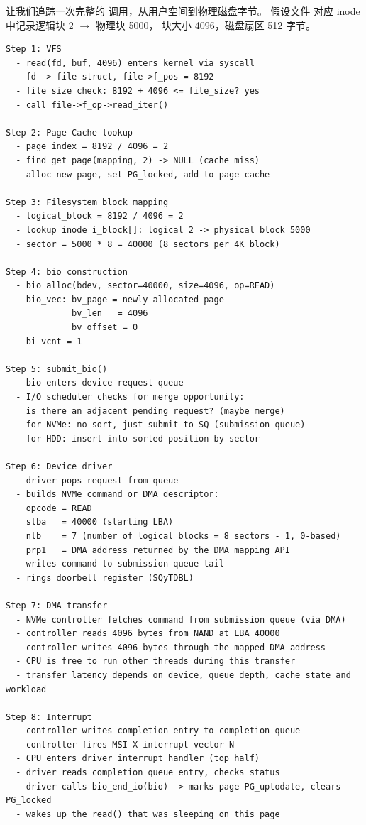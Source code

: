 \begin{filesystemlayout}

让我们追踪一次完整的  调用，从用户空间到物理磁盘字节。
假设文件  对应 inode 中记录逻辑块 2 $\to$ 物理块 5000，
块大小 4096，磁盘扇区 512 字节。

\begin{lstlisting}
Step 1: VFS
  - read(fd, buf, 4096) enters kernel via syscall
  - fd -> file struct, file->f_pos = 8192
  - file size check: 8192 + 4096 <= file_size? yes
  - call file->f_op->read_iter()

Step 2: Page Cache lookup
  - page_index = 8192 / 4096 = 2
  - find_get_page(mapping, 2) -> NULL (cache miss)
  - alloc new page, set PG_locked, add to page cache

Step 3: Filesystem block mapping
  - logical_block = 8192 / 4096 = 2
  - lookup inode i_block[]: logical 2 -> physical block 5000
  - sector = 5000 * 8 = 40000 (8 sectors per 4K block)

Step 4: bio construction
  - bio_alloc(bdev, sector=40000, size=4096, op=READ)
  - bio_vec: bv_page = newly allocated page
             bv_len   = 4096
             bv_offset = 0
  - bi_vcnt = 1

Step 5: submit_bio()
  - bio enters device request queue
  - I/O scheduler checks for merge opportunity:
    is there an adjacent pending request? (maybe merge)
    for NVMe: no sort, just submit to SQ (submission queue)
    for HDD: insert into sorted position by sector

Step 6: Device driver
  - driver pops request from queue
  - builds NVMe command or DMA descriptor:
    opcode = READ
    slba   = 40000 (starting LBA)
    nlb    = 7 (number of logical blocks = 8 sectors - 1, 0-based)
    prp1   = DMA address returned by the DMA mapping API
  - writes command to submission queue tail
  - rings doorbell register (SQyTDBL)

Step 7: DMA transfer
  - NVMe controller fetches command from submission queue (via DMA)
  - controller reads 4096 bytes from NAND at LBA 40000
  - controller writes 4096 bytes through the mapped DMA address
  - CPU is free to run other threads during this transfer
  - transfer latency depends on device, queue depth, cache state and workload

Step 8: Interrupt
  - controller writes completion entry to completion queue
  - controller fires MSI-X interrupt vector N
  - CPU enters driver interrupt handler (top half)
  - driver reads completion queue entry, checks status
  - driver calls bio_end_io(bio) -> marks page PG_uptodate, clears PG_locked
  - wakes up the read() that was sleeping on this page


\end{lstlisting}
\end{filesystemlayout}
